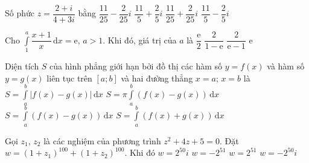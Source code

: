 \begin{ex}%
	Số phức $z=\dfrac{2+i}{4+3i}$ bằng
	\choice
	{\True $\dfrac{11}{25}-\dfrac{2}{25}i$}
	{$\dfrac{11}{5}+\dfrac{2}{5}i$}
	{$\dfrac{11}{25}+\dfrac{2}{25}i$}
	{$\dfrac{11}{5}-\dfrac{2}{5}i$}
\end{ex}
\begin{ex}%
	Cho $\displaystyle\int\limits_1^a\dfrac{x+1}{x}\mathrm{\,d}x=\mathrm{e}$, $a>1$. Khi đó, giá trị của $a$ là
	\choice
	{$\dfrac{\mathrm{e}}{2}$}
	{$\dfrac{2}{1-\mathrm{e}}$}
	{$\dfrac{2}{\mathrm{e}-1}$}
	{\True $\mathrm{e}$}
\end{ex}
\begin{ex}%
	Diện tích $S$ của hình phẳng giới hạn bởi đồ thị các hàm số $y=f(x)$ và hàm số $y=g(x)$ liên tục trên $[a;b]$ và hai đường thẳng $x=a$; $x=b$ là
	\choice
	{\True $S=\displaystyle\int\limits_a^b\left|f(x)-g(x)\right|\mathrm{\,d}x$}
	{$S=\pi\displaystyle\int\limits_a^b(f(x)-g(x))\mathrm{\,d}x$}
	{$S=\displaystyle\int\limits_a^b(f(x)-g(x))\mathrm{\,d}x$}
	{$S=\displaystyle\int\limits_a^b(f(x)+g(x))\mathrm{\,d}x$}
\end{ex}
\begin{ex}%
	Gọi $z_1$, $z_2$ là các nghiệm của phương trình $z^2+4z+5=0$. Đặt $w=(1+z_1)^{100}+(1+z_2)^{100}$. Khi đó
	\choice
	{$w=2^{50}i$}
	{\True $w=-2^{51}$}
	{$w=2^{51}$}
	{$w=-2^{50}i$}
\end{ex}
